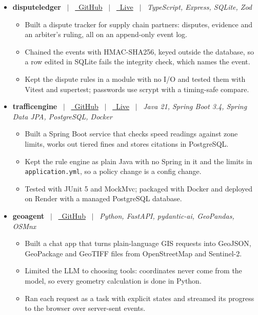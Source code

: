 \documentclass[11pt,a4paper]{article}
\newcommand{\resumeProjectHeading}[3]{%
    \item[]
    \noindent
    \textbf{#1} \ $|$ \ \href{#2}{\small\faGithub\ GitHub} \ $|$ \ \textit{\small #3}
    \par\vspace{0.8pt}
}
\newcommand{\resumeProjectHeadingLive}[4]{%
    \item[]
    \noindent
    \textbf{#1} \ $|$ \ \href{#2}{\small\faGithub\ GitHub} \ $|$ \ \href{#3}{\small\faGlobe\ Live} \ $|$ \ \textit{\small #4}
    \par\vspace{0.8pt}
}
\newcommand{\resumeItem}[1]{%
    \item\small #1
}
\begin{document}
\begin{itemize}[leftmargin=0pt]

\resumeProjectHeadingLive
{disputeledger}
{https://github.com/Krish3101/disputeledger}
{https://disputeledger.onrender.com}
{TypeScript, Express, SQLite, Zod}

\begin{itemize}

\resumeItem{
Built a dispute tracker for supply chain partners: disputes, evidence and an arbiter's ruling, all on an append-only event log.
}

\resumeItem{
Chained the events with HMAC-SHA256, keyed outside the database, so a row edited in SQLite fails the integrity check, which names the event.
}

\resumeItem{
Kept the dispute rules in a module with no I/O and tested them with Vitest and supertest; passwords use scrypt with a timing-safe compare.
}

\end{itemize}

\resumeProjectHeadingLive
{traf\hspace{0.01pt}f\hspace{0.01pt}icengine}
{https://github.com/Krish3101/trafficengine}
{https://traffic-app-oxw2.onrender.com}
{Java 21, Spring Boot 3.4, Spring Data JPA, PostgreSQL, Docker}

\begin{itemize}

\resumeItem{
Built a Spring Boot service that checks speed readings against zone limits, works out tiered fines and stores citations in PostgreSQL.
}

\resumeItem{
Kept the rule engine as plain Java with no Spring in it and the limits in \texttt{application.yml}, so a policy change is a config change.
}

\resumeItem{
Tested with JUnit 5 and MockMvc; packaged with Docker and deployed on Render with a managed PostgreSQL database.
}

\end{itemize}

\resumeProjectHeading
{geoagent}
{https://github.com/Krish3101/geoagent}
{Python, FastAPI, pydantic-ai, GeoPandas, OSMnx}

\begin{itemize}

\resumeItem{
Built a chat app that turns plain-language GIS requests into GeoJSON, GeoPackage and GeoTIFF files from \mbox{OpenStreetMap} and Sentinel-2.
}

\resumeItem{
Limited the LLM to choosing tools: coordinates never come from the model, so every geometry calculation is done in Python.
}

\resumeItem{
Ran each request as a task with explicit states and streamed its progress to the browser over server-sent events.
}

\end{itemize}

\end{itemize}
\end{document}
